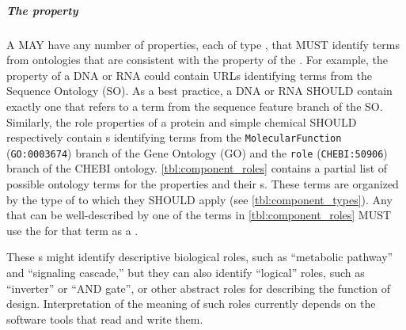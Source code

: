 \subparagraph{The  property}
\label{sec:role:C}

A  MAY have any number of  properties, each of type , that MUST identify terms from ontologies that are consistent with the  property of the .  
For example, the  property of a DNA or RNA  could contain URLs identifying terms from the Sequence Ontology (SO). As a best practice, a DNA or RNA  SHOULD contain exactly one  that refers to a term from the sequence feature branch of the SO.
Similarly, the role properties of a protein and simple chemical  SHOULD respectively contain s identifying terms from the \texttt{MolecularFunction} (\texttt{GO:0003674}) branch of the Gene Ontology (GO) and the \texttt{role} (\texttt{CHEBI:50906}) branch of the CHEBI ontology.
\ref{tbl:component_roles} contains a partial list of possible ontology terms for the  properties and their s. These terms are organized by the type of  to which they SHOULD apply (see \ref{tbl:component_types}). Any  that can be well-described by one of the terms in \ref{tbl:component_roles} MUST use the  for that term as a .

These s might identify descriptive biological roles, such as ``metabolic pathway'' and ``signaling cascade,'' but they can also identify ``logical'' roles, such as ``inverter'' or ``AND gate'', or other abstract roles for describing the function of design. Interpretation of the meaning of such roles currently depends on the software tools that read and write them.

